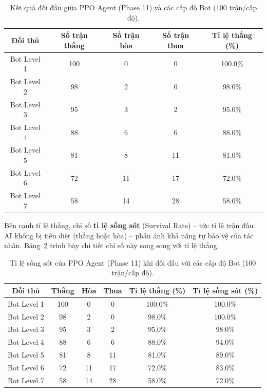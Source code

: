 \documentclass[a4paper, 12pt]{report}
\begin{document}
  \begin{table}[H]
  \centering
  \caption{Kết quả đối đầu giữa PPO Agent (Phase 11) và các cấp độ Bot (100 trận/cấp độ).}
  \label{tab:win_loss_results}
  \renewcommand{\arraystretch}{1.2}
  \small
  \begin{tabular}{c c c c c}
    \toprule
    \textbf{Đối thủ} & \textbf{Số trận thắng} & \textbf{Số trận hòa} & \textbf{Số trận thua} & \textbf{Tỉ lệ thắng (\%)} \\
    \midrule
    Bot Level 1 & 100 & 0  & 0  & 100.0\% \\
    Bot Level 2 & 98  & 2  & 0  & 98.0\% \\
    Bot Level 3 & 95  & 3  & 2  & 95.0\% \\
    Bot Level 4 & 88  & 6  & 6  & 88.0\% \\
    Bot Level 5 & 81  & 8  & 11 & 81.0\% \\
    Bot Level 6 & 72  & 11 & 17 & 72.0\% \\
    Bot Level 7 & 58  & 14 & 28 & 58.0\% \\
    \bottomrule
  \end{tabular}
  \end{table}

  Bên cạnh tỉ lệ thắng, chỉ số \textbf{tỉ lệ sống sót} (Survival Rate) -- tức tỉ lệ trận đấu AI không bị tiêu diệt (thắng hoặc hòa) -- phản ánh khả năng tự bảo vệ của tác nhân. Bảng~\ref{tab:survival_results} trình bày chi tiết chỉ số này song song với tỉ lệ thắng.

  \begin{table}[H]
  \centering
  \caption{Tỉ lệ sống sót của PPO Agent (Phase 11) khi đối đầu với các cấp độ Bot (100 trận/cấp độ).}
  \label{tab:survival_results}
  \renewcommand{\arraystretch}{1.2}
  \small
  \begin{tabular}{c c c c c c}
    \toprule
    \textbf{Đối thủ} & \textbf{Thắng} & \textbf{Hòa} & \textbf{Thua} & \textbf{Tỉ lệ thắng (\%)} & \textbf{Tỉ lệ sống sót (\%)} \\
    \midrule
    Bot Level 1 & 100 & 0  & 0  & 100.0\% & 100.0\% \\
    Bot Level 2 & 98  & 2  & 0  & 98.0\%  & 100.0\% \\
    Bot Level 3 & 95  & 3  & 2  & 95.0\%  & 98.0\%  \\
    Bot Level 4 & 88  & 6  & 6  & 88.0\%  & 94.0\%  \\
    Bot Level 5 & 81  & 8  & 11 & 81.0\%  & 89.0\%  \\
    Bot Level 6 & 72  & 11 & 17 & 72.0\%  & 83.0\%  \\
    Bot Level 7 & 58  & 14 & 28 & 58.0\%  & 72.0\%  \\
    \bottomrule
  \end{tabular}
  \end{table}
\end{document}
